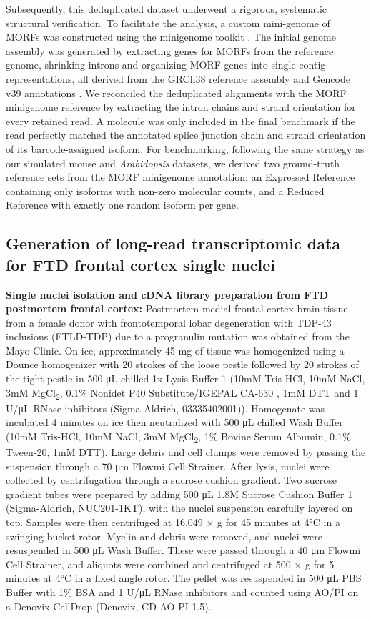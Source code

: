Subsequently, this deduplicated dataset underwent a rigorous, systematic structural verification. To facilitate the analysis, a custom mini-genome of MORFs was constructed using the minigenome toolkit \citep{haas2017}. The initial genome assembly was generated by extracting genes for MORFs from the reference genome, shrinking introns and organizing MORF genes into single-contig representations, all derived from the GRCh38 reference assembly and Gencode v39 annotations \citep{gencodend}. We reconciled the deduplicated alignments with the MORF minigenome reference by extracting the intron chains and strand orientation for every retained read. A molecule was only included in the final benchmark if the read perfectly matched the annotated splice junction chain and strand orientation of its barcode-assigned isoform. For benchmarking, following the same strategy as our simulated mouse and \emph{Arabidopsis} datasets, we derived two ground-truth reference sets from the MORF minigenome annotation: an Expressed Reference containing only isoforms with non-zero molecular counts, and a Reduced Reference with exactly one random isoform per gene.

\subsection{Generation of long-read transcriptomic data for FTD frontal cortex single nuclei}\label{generation-of-long-read-transcriptomic-data-for-ftd-frontal-cortex-single-nuclei}

\textbf{Single nuclei isolation and cDNA library preparation from FTD postmortem frontal cortex:} Postmortem medial frontal cortex brain tissue from a female donor with frontotemporal lobar degeneration with TDP-43 inclusions (FTLD-TDP) due to a progranulin mutation was obtained from the Mayo Clinic. On ice, approximately 45 mg of tissue was homogenized using a Dounce homogenizer with 20 strokes of the loose pestle followed by 20 strokes of the tight pestle in 500 μL chilled 1x Lysis Buffer 1 (10mM Tris-HCl, 10mM NaCl, 3mM MgCl\textsubscript{2}, 0.1\% Nonidet P40 Substitute/IGEPAL CA-630 , 1mM DTT and 1 U/μL RNase inhibitors (Sigma-Aldrich, 03335402001)). Homogenate was incubated 4 minutes on ice then neutralized with 500 μL chilled Wash Buffer (10mM Tris-HCl, 10mM NaCl, 3mM MgCl\textsubscript{2}, 1\% Bovine Serum Albumin, 0.1\% Tween-20, 1mM DTT). Large debris and cell clumps were removed by passing the suspension through a 70 μm Flowmi Cell Strainer. After lysis, nuclei were collected by centrifugation through a sucrose cushion gradient. Two sucrose gradient tubes were prepared by adding 500 μL 1.8M Sucrose Cushion Buffer 1 (Sigma-Aldrich, NUC201-1KT), with the nuclei suspension carefully layered on top. Samples were then centrifuged at 16,049 × g for 45 minutes at 4°C in a swinging bucket rotor. Myelin and debris were removed, and nuclei were resuspended in 500 μL Wash Buffer. These were passed through a 40 μm Flowmi Cell Strainer, and aliquots were combined and centrifuged at 500 × g for 5 minutes at 4°C in a fixed angle rotor. The pellet was resuspended in 500 μL PBS Buffer with 1\% BSA and 1 U/μL RNase inhibitors and counted using AO/PI on a Denovix CellDrop (Denovix, CD-AO-PI-1.5).

